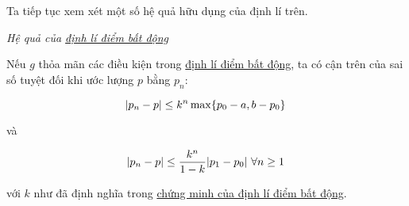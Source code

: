 \documentclass[../../Lectures.tex]{subfiles}
\begin{document}
Ta tiếp tục xem xét một số hệ quả hữu dụng của định lí trên.

\begin{coro}
    \emph{Hệ quả của \hyperref[thm:fixed_point]{định lí điểm bất động}}

    Nếu \(g\) thỏa mãn các điều kiện trong \hyperref[thm:fixed_point]{định lí
    điểm bất động}, ta có cận trên của sai số tuyệt đối khi ước lượng \(p\) bằng
    \(p_n\):

    \begin{equation}\label{ieq:coro:thm:fixed_point_1}
        \abs{p_n - p} \leq k^n \max \{p_0 - a, b - p_0\}
    \end{equation}

    và

    \begin{equation}\label{ieq:coro:thm:fixed_point_2}
        \abs{p_n - p} \leq \frac{k^n}{1 - k} \abs{p_1 - p_0} \, \forall n \geq 1
    \end{equation}

    với \(k\) như đã định nghĩa trong \hyperref[proof:thm:fixed_point]{chứng
    minh của định lí điểm bất động}.
\end{coro}
\end{document}
